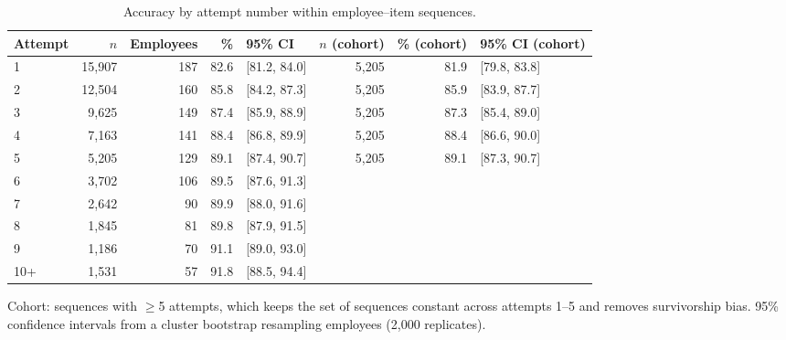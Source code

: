 \begin{table}[htbp]
\centering
\caption{Accuracy by attempt number within employee--item sequences.}
\label{tab:learning_curve}
\small
\setlength{\tabcolsep}{3.5pt}
\begin{tabular}{lrrrlrrl}
\toprule
Attempt & $n$ & Employees & \% & 95\% CI & $n$ (cohort) & \% (cohort) & 95\% CI (cohort) \\
\midrule
1 & 15,907 & 187 & 82.6 & [81.2, 84.0] & 5,205 & 81.9 & [79.8, 83.8] \\
2 & 12,504 & 160 & 85.8 & [84.2, 87.3] & 5,205 & 85.9 & [83.9, 87.7] \\
3 & 9,625 & 149 & 87.4 & [85.9, 88.9] & 5,205 & 87.3 & [85.4, 89.0] \\
4 & 7,163 & 141 & 88.4 & [86.8, 89.9] & 5,205 & 88.4 & [86.6, 90.0] \\
5 & 5,205 & 129 & 89.1 & [87.4, 90.7] & 5,205 & 89.1 & [87.3, 90.7] \\
6 & 3,702 & 106 & 89.5 & [87.6, 91.3] &  &  &  \\
7 & 2,642 & 90 & 89.9 & [88.0, 91.6] &  &  &  \\
8 & 1,845 & 81 & 89.8 & [87.9, 91.5] &  &  &  \\
9 & 1,186 & 70 & 91.1 & [89.0, 93.0] &  &  &  \\
10+ & 1,531 & 57 & 91.8 & [88.5, 94.4] &  &  &  \\
\bottomrule
\end{tabular}

\vspace{2pt}
\parbox{\linewidth}{\footnotesize Cohort: sequences with $\geq$5 attempts, which keeps the set of sequences constant across attempts 1--5 and removes survivorship bias. 95\% confidence intervals from a cluster bootstrap resampling employees (2,000 replicates).}
\end{table}
